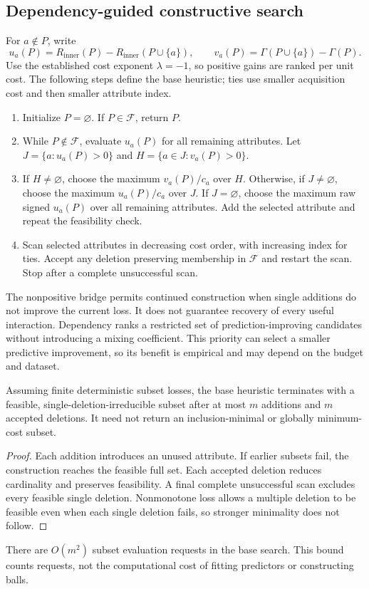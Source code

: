 \subsection{Dependency-guided constructive search}
For $a\notin P$, write
\begin{equation}
 u_a(P)=R_{\mathrm{inner}}(P)-R_{\mathrm{inner}}(P\cup\{a\}),\qquad
 v_a(P)=\Gamma(P\cup\{a\})-\Gamma(P).
\end{equation}
Use the established cost exponent $\lambda=-1$, so positive gains are ranked per unit cost. The following steps define the base heuristic; ties use smaller acquisition cost and then smaller attribute index.
\begin{enumerate}
\item Initialize $P=\varnothing$. If $P\in\mathcal F$, return $P$.
\item While $P\notin\mathcal F$, evaluate $u_a(P)$ for all remaining attributes. Let $J=\{a:u_a(P)>0\}$ and $H=\{a\in J:v_a(P)>0\}$.
\item If $H\ne\varnothing$, choose the maximum $v_a(P)/c_a$ over $H$. Otherwise, if $J\ne\varnothing$, choose the maximum $u_a(P)/c_a$ over $J$. If $J=\varnothing$, choose the maximum raw signed $u_a(P)$ over all remaining attributes. Add the selected attribute and repeat the feasibility check.
\item Scan selected attributes in decreasing cost order, with increasing index for ties. Accept any deletion preserving membership in $\mathcal F$ and restart the scan. Stop after a complete unsuccessful scan.
\end{enumerate}
The nonpositive bridge permits continued construction when single additions do not improve the current loss. It does not guarantee recovery of every useful interaction. Dependency ranks a restricted set of prediction-improving candidates without introducing a mixing coefficient. This priority can select a smaller predictive improvement, so its benefit is empirical and may depend on the budget and dataset.

\begin{proposition}
Assuming finite deterministic subset losses, the base heuristic terminates with a feasible, single-deletion-irreducible subset after at most $m$ additions and $m$ accepted deletions. It need not return an inclusion-minimal or globally minimum-cost subset.
\end{proposition}
\begin{proof}
Each addition introduces an unused attribute. If earlier subsets fail, the construction reaches the feasible full set. Each accepted deletion reduces cardinality and preserves feasibility. A final complete unsuccessful scan excludes every feasible single deletion. Nonmonotone loss allows a multiple deletion to be feasible even when each single deletion fails, so stronger minimality does not follow.
\end{proof}
There are $O(m^2)$ subset evaluation requests in the base search. This bound counts requests, not the computational cost of fitting predictors or constructing balls.

